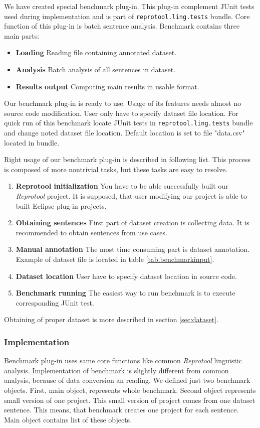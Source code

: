 We have created special benchmark plug-in. This plug-in complement JUnit tests used during implementation and is part of {\tt reprotool.ling.tests} bundle. Core function of this plug-in is batch sentence analysis. Benchmark contains three main parts:

\begin{itemize}
\item {\bf Loading} Reading file containing annotated dataset.
\item {\bf Analysis} Batch analysis of all sentences in dataset.
\item {\bf Results output} Computing main results in usable format.
\end{itemize}

Our benchmark plug-in is ready to use. Usage of its features needs almost no source code modification. User only have to specify dataset file location. For quick run of this benchmark locate JUnit tests in {\tt reprotool.ling.tests} bundle and change noted dataset file location. Default location is set to file "data.csv" located in bundle.

Right usage of our benchmark plug-in is described in following list. This process is composed of more nontrivial tasks, but these tasks are easy to resolve.

\begin{enumerate}
\item {\bf Reprotool initialization} You have to be able successfully built our \emph{Reprotool} project. It is supposed, that user modifying our project is able to built Eclipse plug-in projects.
\item {\bf Obtaining sentences} First part of dataset creation is collecting data. It is recommended to obtain sentences from use cases.
\item {\bf Manual annotation} The most time consuming part is dataset annotation. Example of dataset file is located in table \ref{tab.benchmarkinput}.
\item {\bf Dataset location} User have to specify dataset location in source code.
\item {\bf Benchmark running} The easiest way to run benchmark is to execute corresponding JUnit test.
\end{enumerate}

Obtaining of proper dataset is more described in section \ref{sec:dataset}. 

\subsubsection{Implementation}
Benchmark plug-in uses same core functions like common \emph{Reprotool} linguistic analysis. Implementation of benchmark is slightly different from common analysis, because of data conversion an reading. We defined just two benchmark objects. First, main object, represents whole benchmark. Second object represents small version of one project. This small version of project comes from one dataset sentence. This means, that benchmark creates one project for each sentence. Main object contains list of these objects.

